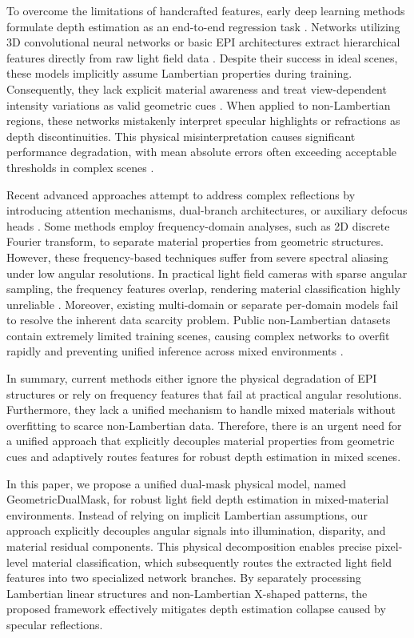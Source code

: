 \documentclass[lettersize,journal]{IEEEtran}
\begin{document}
To overcome the limitations of handcrafted features, early deep learning methods formulate depth estimation as an end-to-end regression task \cite{earlyend}. Networks utilizing 3D convolutional neural networks or basic EPI architectures extract hierarchical features directly from raw light field data \cite{cnnbasi}. Despite their success in ideal scenes, these models implicitly assume Lambertian properties during training. Consequently, they lack explicit material awareness and treat view-dependent intensity variations as valid geometric cues \cite{impliclamb}. When applied to non-Lambertian regions, these networks mistakenly interpret specular highlights or refractions as depth discontinuities. This physical misinterpretation causes significant performance degradation, with mean absolute errors often exceeding acceptable thresholds in complex scenes \cite{perfordegr}.

Recent advanced approaches attempt to address complex reflections by introducing attention mechanisms, dual-branch architectures, or auxiliary defocus heads \cite{attentmech}. Some methods employ frequency-domain analyses, such as 2D discrete Fourier transform, to separate material properties from geometric structures. However, these frequency-based techniques suffer from severe spectral aliasing under low angular resolutions. In practical light field cameras with sparse angular sampling, the frequency features overlap, rendering material classification highly unreliable \cite{nonunisamp}. Moreover, existing multi-domain or separate per-domain models fail to resolve the inherent data scarcity problem. Public non-Lambertian datasets contain extremely limited training scenes, causing complex networks to overfit rapidly and preventing unified inference across mixed environments \cite{datascar}.

In summary, current methods either ignore the physical degradation of EPI structures or rely on frequency features that fail at practical angular resolutions. Furthermore, they lack a unified mechanism to handle mixed materials without overfitting to scarce non-Lambertian data. Therefore, there is an urgent need for a unified approach that explicitly decouples material properties from geometric cues and adaptively routes features for robust depth estimation in mixed scenes.

In this paper, we propose a unified dual-mask physical model, named GeometricDualMask, for robust light field depth estimation in mixed-material environments. Instead of relying on implicit Lambertian assumptions, our approach explicitly decouples angular signals into illumination, disparity, and material residual components. This physical decomposition enables precise pixel-level material classification, which subsequently routes the extracted light field features into two specialized network branches. By separately processing Lambertian linear structures and non-Lambertian X-shaped patterns, the proposed framework effectively mitigates depth estimation collapse caused by specular reflections.
\end{document}
